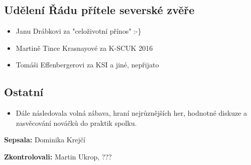 \documentclass[11pt,a4paper]{article}
\begin{document}
\subsection*{Udělení Řádu přítele severské zvěře}
\begin{itemize}[itemsep=0pt]
\item Janu Drábkovi za "celoživotní přínos" :-\}
\item Martině Tince Krasnayové za K-SCUK 2016
\item Tomáši Effenbergerovi za KSI a jiné, nepřijato
\end{itemize}

\subsection*{Ostatní}
\begin{itemize}[itemsep=0pt]
\item Dále následovala volná zábava, hraní nejrůznějších her, hodnotné diskuze a zasvěcování nováčků do praktik spolku.
\end{itemize}

\textbf{Sepsala:} Dominika Krejčí

\textbf{Zkontrolovali:} Martin Ukrop, ???
\end{document}
